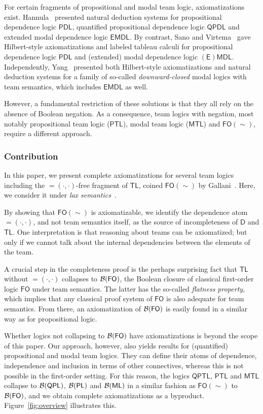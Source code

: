 \documentclass[a4paper,english,fleqn,11pt,final]{scrartcl}
\newcommand{\negg}{{\sim}}
\newcommand{\depop}{{=\!\!(\cdot,\cdot)}}
\newcommand{\depopp}{\depop}
\newcommand{\logic}[1]{\ensuremath{\mathsf{#1}}\xspace}
\newcommand{\D}{\logic{D}}
\newcommand{\PL}{\logic{PL}}
\newcommand{\QPL}{\logic{QPL}}
\newcommand{\ML}{\logic{ML}}
\newcommand{\FO}{\logic{FO}}
\newcommand{\PTL}{\logic{PTL}}
\newcommand{\QPDL}{\logic{QPDL}}
\newcommand{\PDL}{\logic{PDL}}
\newcommand{\QPTL}{\logic{QPTL}}
\newcommand{\MTL}{\logic{MTL}}
\newcommand{\TL}{\logic{TL}}
\newcommand{\EMDL}{\logic{EMDL}}
\newcommand{\EEMDL}{\logic{(E)MDL}}
\newcommand{\calB}{\protect\ensuremath{\mathcal{B}}}
\theoremstyle{plain}
\theoremstyle{definition}
\begin{document}
\smallskip

For certain fragments of propositional and modal team logic, axiomatizations exist.
Hannula~\cite{Hannula16} presented natural deduction systems for propositional dependence logic $\PDL$, quantified propositional dependence logic $\QPDL$ and extended modal dependence logic $\EMDL$.
By contrast, Sano and Virtema~\cite{sano_et_al} gave Hilbert-style axiomatizations and labeled tableau calculi for propositional dependence logic $\PDL$ and (extended) modal dependence logic $\EEMDL$.
Independently, Yang~\cite{Yang17} presented both Hilbert-style axiomatizations and natural deduction systems for a family of so-called \emph{downward-closed} modal logics with team semantics, which includes $\EMDL$ as well.

However, a fundamental restriction of these solutions is that they all rely on the absence of Boolean negation.
As a consequence, team logics with negation, most notably propositional team logic ($\PTL$), modal team logic ($\MTL$) and $\FO(\negg)$, require a different approach.

\smallskip

\subsubsection*{Contribution}

In this paper, we present complete axiomatizations for several team logics including the $\depopp$-free fragment of $\TL$, coined $\FO(\negg)$ by Gallani~\cite{Galliani14}.
Here, we consider it under \emph{lax semantics}~\cite{galliani_inclusion_2012}.

By showing that $\FO(\negg)$ is axiomatizable, we identify the dependence atom $\depopp$, and not team semantics itself, as the source of incompleteness of $\D$ and $\TL$.
One interpretation is that reasoning about teams can be axiomatized; but only if we cannot talk about the internal dependencies between the elements of the team.

A crucial step in the completeness proof is the perhaps surprising fact that $\TL$ without $\depopp$ collapses to $\calB(\FO)$, the Boolean closure of classical first-order logic $\FO$ under team semantics.
The latter has the so-called \emph{flatness property}, which implies that any classical proof system of $\FO$ is also adequate for team semantics.
From there, an axiomatization of $\calB(\FO)$ is easily found in a similar way as for propositional logic.

Whether logics not collapsing to $\calB(\FO)$ have axiomatizations is beyond the scope of this paper.
Our approach, however, also yields results for (quantified) propositional and modal team logics.
They can define their atoms of dependence, independence and inclusion in terms of other connectives, whereas this is not possible in the first-order setting.
For this reason, the logics $\QPTL$, $\PTL$ and $\MTL$ collapse to $\calB(\QPL)$, $\calB(\PL)$ and $\calB(\ML)$ in a similar fashion as $\FO(\negg)$ to $\calB(\FO)$, and we obtain complete axiomatizations as a byproduct.
Figure~\ref{fig:overview} illustrates this.
\end{document}
